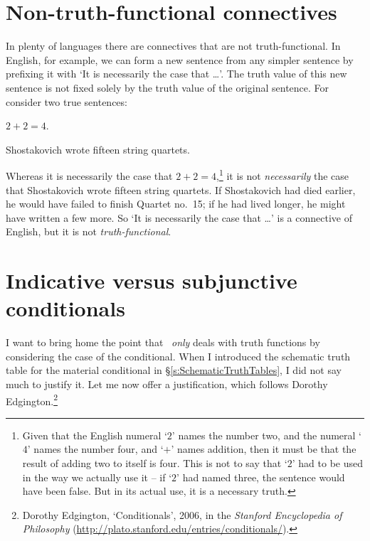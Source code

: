\section{Non-truth-functional connectives}

In plenty of languages there are connectives that are not truth-functional. In English, for example, we can form a new sentence from any simpler sentence by prefixing it with `It is necessarily the case that …'. The truth value of this new sentence is not fixed solely by the truth value of the original sentence. For consider two true sentences:
	\begin{earg}
		\item $2 + 2 = 4$.
		\item Shostakovich wrote fifteen string quartets.
	\end{earg}
Whereas it is necessarily the case that $2 + 2 = 4$,\footnote{Given that the English numeral `$2$' names the number two, and the numeral `$4$' names the number four, and `$+$' names addition, then it must be that the result of adding two to itself is four. This is not to say that `$2$' had to be used in the way we actually use it – if `$2$' had named three, the sentence would have been false. But in its actual use, it is a necessary truth.} it is not \emph{necessarily} the case that Shostakovich wrote fifteen string quartets. If Shostakovich had died earlier, he would have failed to finish Quartet no.\ 15; if he had lived longer, he might have written a few more. So `It is necessarily the case that …' is a connective of English, but it is not \emph{truth-functional}.

\section{Indicative versus subjunctive conditionals}\label{s:IndicativeSubjunctive}
I want to bring home the point that \TFL\ \emph{only} deals with truth functions by considering the case of the conditional. When I introduced the schematic truth table for the material conditional in §\ref{s:SchematicTruthTables}, I did not say much to justify it. Let me now offer a justification, which follows Dorothy Edgington.\footnote{Dorothy Edgington, `Conditionals', 2006, in the \emph{Stanford Encyclopedia of Philosophy} (\url{http://plato.stanford.edu/entries/conditionals/}).} 

